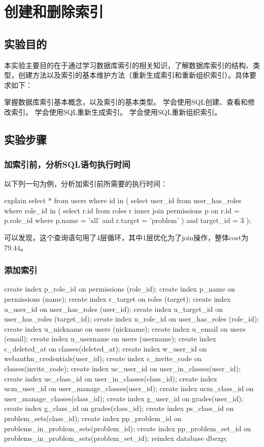 \documentclass{ctexrep}
\begin{document}
\chapter{创建和删除索引}
\section{实验目的}

本实验主要目的在于通过学习数据库索引的相关知识，了解数据库索引的结构、类型，创建方法以及索引的基本维护方法（重新生成索引和重新组织索引）。具体要求如下：
\begin{outline}
    \1 掌握数据库索引基本概念，以及索引的基本类型。
    \1 学会使用SQL创建、查看和修改索引。
    \1 学会使用SQL重新生成索引。
    \1 学会使用SQL重新组织索引。
\end{outline}
\section{实验步骤}
\subsection{加索引前，分析SQL语句执行时间}
以下列一句为例，分析加索引前所需要的执行时间：
\begin{run}
    explain select * from users where id in (
        select user_id from user_has_roles where role_id in (
            select r.id from roles r 
            inner join permissions p on r.id = p.role_id 
            where p.name = 'all' and r.target = 'problem'
        ) and target_id = 3
    );
\end{run}
可以发现，这个查询语句用了4层循环，其中1层优化为了join操作，整体cost为79.44。

\subsection{添加索引}

\begin{run}
    create index p_role_id on permissions (role_id);
    create index p_name on permissions (name);
    create index r_target on roles (target);
    create index u_user_id on user_has_roles (user_id);
    create index u_target_id on user_has_roles (target_id);
    create index u_role_id on user_has_roles (role_id);
    create index u_nickname on users (nickname);
    create index u_email on users (email);
    create index u_username on users (username);
    create index c_deleted_at on classes(deleted_at);
    create index w_user_id on webauthn_credentials(user_id);
    create index c_invite_code on classes(invite_code);
    create index uc_user_id on user_in_classes(user_id);
    create index uc_class_id on user_in_classes(class_id);
    create index ucm_user_id on user_manage_classes(user_id);
    create index ucm_class_id on user_manage_classes(class_id);
    create index g_user_id on grades(user_id);
    create index g_class_id on grades(class_id);
    create index ps_class_id on problem_sets(class_id);
    create index pp_problem_id on problems_in_problem_sets(problem_id);
    create index pp_problem_set_id on problems_in_problem_sets(problem_set_id);
    reindex database dbexp;
\end{run}
\end{document}
